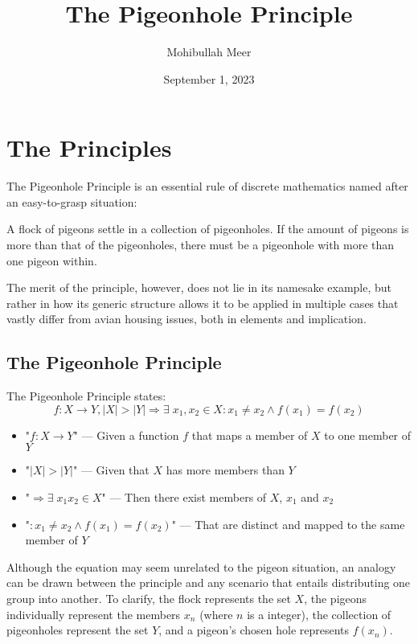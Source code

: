 \documentclass{article}
\title{The Pigeonhole Principle}
\author{Mohibullah Meer}
\date{September 1, 2023}
\begin{document}
\maketitle

\section{The Principles}

The Pigeonhole Principle is an essential rule of discrete mathematics named after an easy-to-grasp situation:

\begin{center}
  A flock of pigeons settle in a collection of pigeonholes. If the amount of pigeons is more than that of the pigeonholes, there must be a pigeonhole with more than one pigeon within.
\end{center}

The merit of the principle, however, does not lie in its namesake example, but rather in how its generic structure allows it to be applied in multiple cases that vastly differ from avian housing issues, both in elements and implication.

\subsection{The Pigeonhole Principle}

The Pigeonhole Principle states:
\begin{equation}
  f: X \rightarrow Y, |X| > |Y| \Rightarrow \exists \; x_1, x_2 \in X: x_1 \neq x_2 \land f(x_1) = f(x_2)
\end{equation}

\begin{itemize}
\item "$f: X \rightarrow Y$" --- Given a function $f$ that maps a member of $X$ to one member of $Y$
\item "$|X| > |Y|$" --- Given that $X$ has more members than $Y$
\item "$\Rightarrow \exists \; x_1 x_2 \in X$" --- Then there exist members of $X$, $x_1$ and $x_2$
\item "$: x_1 \neq x_2 \land f(x_1) = f(x_2)$" --- That are distinct and mapped to the same member of $Y$
\end{itemize}

Although the equation may seem unrelated to the pigeon situation, an analogy can be drawn between the principle and any scenario that entails distributing one group into another. To clarify, the flock represents the set $X$, the pigeons individually represent the members $x_n$ (where $n$ is a integer), the collection of pigeonholes represent the set $Y$, and a pigeon's chosen hole represents $f(x_n)$.
\end{document}
